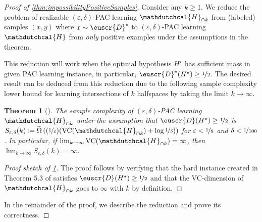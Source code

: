 \documentclass[11pt]{article}
\theoremstyle{plain}
\newtheorem{theorem}{Theorem}[section]
\theoremstyle{definition}
\theoremstyle{remark}
\newcommand{\inparen}[1]{\left(#1\right)}
\newcommand{\nfrac}[2]{\nicefrac{#1}{#2}}
\newcommand{\vc}{\textrm{\rm VC}}
\newcommand{\eps}{\varepsilon}
\newcommand{\wt}[1]{\widetilde{#1}}
\newcommand{\customcal}[1]{\euscr{#1}}
\newcommand{\cD}{\customcal{D}}
\newcommand{\hypo}[1]{\mathdutchcal{#1}}
\newcommand{\hyH}{\hypo{H}}
\newcommand{\optset}{{H^\star}}
\newcommand{\cDtrue}{\cD^\star}
\begin{document}
    \begin{proof}[Proof of \cref{thm:impossibilityPositiveSamples}]
        Consider any $k\geq 1$.
        We reduce the problem of realizable $(\eps,\delta)$-PAC learning {$\hyH_{\cap k}$} from (labeled) samples $(x,y)$ where $x\sim \cDtrue$ to $(\eps,\delta)$-PAC learning {$\hyH$} from \textit{only} positive examples under the assumptions in the theorem.
        
        This reduction will work when the optimal hypothesis $\optset$ has sufficient mass in given PAC learning instance, in particular, $\cDtrue(\optset)\geq \nfrac{1}{2}$.
        The desired result can be deduced from this reduction due to the following sample complexity lower bound for learning intersections of $k$ halfspaces by taking the limit $k\to\infty$.
        \begin{theorem}[]
                \label{thm:PAClearningLowerbound}
                The sample complexity of $(\eps,\delta)$-PAC learning {$\hyH_{\cap k}$} under the assumption that $\cD(\optset)\geq \nfrac{1}{2}$ is $S_{\eps,\delta}(k)\coloneqq \wt{\Omega}\inparen{(\nfrac{1}{\eps})(\vc{}(\hyH_{\cap k})+\log{\nfrac{1}{\delta}})}$ for $\eps<\nfrac{1}{8}$ and $\delta < \nfrac{1}{100}$.
                {In particular, if $\lim_{k\to \infty} \vc{}(\hyH_{\cap k})=\infty$, then $\lim_{k\to \infty} S_{\eps,\delta}(k)=\infty$.}
        \end{theorem}
        \begin{proof}[Proof sketch of \cref{thm:PAClearningLowerbound}]
                The proof follows by verifying that the hard instance created in Theorem 5.3 of \cite{neuralNetwork2009bartlett} satisfies $\cD(\optset)\geq \nfrac{1}{2}$ and that the VC-dimension of {$\hyH_{\cap k}$ goes to $\infty$ with $k$ by definition}. 
            \end{proof}
        

        \noindent In the remainder of the proof, we describe the reduction and prove its correctness.


\end{proof}
\end{document}
